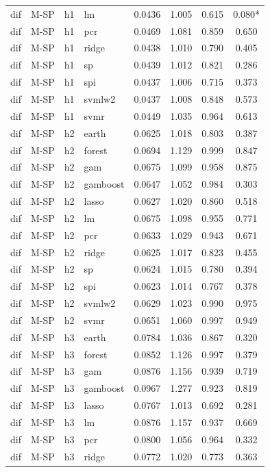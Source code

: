 \begin{ThreePartTable}
\begin{longtable}[t]{llclcccc}
dif & M-SP & h1 & lm & 0.0436 & 1.005 & 0.615 & 0.080*\\
dif & M-SP & h1 & pcr & 0.0469 & 1.081 & 0.859 & 0.650\\
dif & M-SP & h1 & ridge & 0.0438 & 1.010 & 0.790 & 0.405\\
dif & M-SP & h1 & sp & 0.0439 & 1.012 & 0.821 & 0.286\\
dif & M-SP & h1 & spi & 0.0437 & 1.006 & 0.715 & 0.373\\
dif & M-SP & h1 & svmlw2 & 0.0437 & 1.008 & 0.848 & 0.573\\
dif & M-SP & h1 & svmr & 0.0449 & 1.035 & 0.964 & 0.613\\
\addlinespace
dif & M-SP & h2 & earth & 0.0625 & 1.018 & 0.803 & 0.387\\
dif & M-SP & h2 & forest & 0.0694 & 1.129 & 0.999 & 0.847\\
dif & M-SP & h2 & gam & 0.0675 & 1.099 & 0.958 & 0.875\\
dif & M-SP & h2 & gamboost & 0.0647 & 1.052 & 0.984 & 0.303\\
dif & M-SP & h2 & lasso & 0.0627 & 1.020 & 0.860 & 0.518\\
dif & M-SP & h2 & lm & 0.0675 & 1.098 & 0.955 & 0.771\\
dif & M-SP & h2 & pcr & 0.0633 & 1.029 & 0.943 & 0.671\\
dif & M-SP & h2 & ridge & 0.0625 & 1.017 & 0.823 & 0.455\\
dif & M-SP & h2 & sp & 0.0624 & 1.015 & 0.780 & 0.394\\
dif & M-SP & h2 & spi & 0.0623 & 1.014 & 0.767 & 0.378\\
dif & M-SP & h2 & svmlw2 & 0.0629 & 1.023 & 0.990 & 0.975\\
dif & M-SP & h2 & svmr & 0.0651 & 1.060 & 0.997 & 0.949\\
\addlinespace
dif & M-SP & h3 & earth & 0.0784 & 1.036 & 0.867 & 0.320\\
dif & M-SP & h3 & forest & 0.0852 & 1.126 & 0.997 & 0.379\\
dif & M-SP & h3 & gam & 0.0876 & 1.156 & 0.939 & 0.719\\
dif & M-SP & h3 & gamboost & 0.0967 & 1.277 & 0.923 & 0.819\\
dif & M-SP & h3 & lasso & 0.0767 & 1.013 & 0.692 & 0.281\\
dif & M-SP & h3 & lm & 0.0876 & 1.157 & 0.937 & 0.669\\
dif & M-SP & h3 & pcr & 0.0800 & 1.056 & 0.964 & 0.332\\
dif & M-SP & h3 & ridge & 0.0772 & 1.020 & 0.773 & 0.363\\

\end{longtable}
\end{ThreePartTable}
